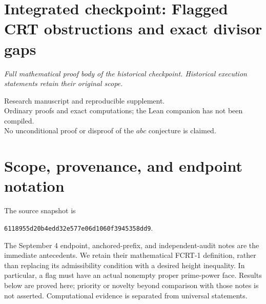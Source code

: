 \clearpage
\begingroup
\let\rad\relax
\newcommand{\rad}{\operatorname{rad}}
\let\dist\relax
\newcommand{\dist}{\operatorname{dist}}
\let\FCRT\relax
\newcommand{\FCRT}{\mathrm{FCRT}}
\let\SCRT\relax
\newcommand{\SCRT}{\mathrm{SCRT}}
\let\PBT\relax
\newcommand{\PBT}{\mathrm{PBT}}
\let\pos\relax
\newcommand{\pos}[1]{\left(#1\right)_+}
\let\N\relax
\newcommand{\N}{\mathbb N}
\let\Z\relax
\newcommand{\Z}{\mathbb Z}
\let\R\relax
\newcommand{\R}{\mathbb R}
\section*{Integrated checkpoint: Flagged CRT obstructions and exact divisor gaps}
\label{checkpoint:fcrt}
\noindent\textit{Full mathematical proof body of the historical checkpoint. Historical execution statements retain their original scope.}\medskip


\begin{center}\small
Research manuscript and reproducible supplement.\\
Ordinary proofs and exact computations; the Lean companion has not been compiled.\\
No unconditional proof or disproof of the \(abc\) conjecture is claimed.
\end{center}

\bigskip

\section{Scope, provenance, and endpoint notation}
The source snapshot is
\begin{center}\small\texttt{6118955d20b4edd32e577e06d1060f3945358dd9}.\end{center}
The September 4 endpoint, anchored-prefix, and independent-audit notes
\cite{fcrt:repoendpoint,fcrt:repoanchor,fcrt:repoaudit} are the immediate antecedents.
We retain their mathematical FCRT-1 definition, rather than replacing its
admissibility condition with a desired height inequality. In particular, a
flag must have an actual nonempty proper prime-power face. Results below are
proved here; priority or novelty beyond comparison with those notes is not
asserted. Computational evidence is separated from universal statements.

